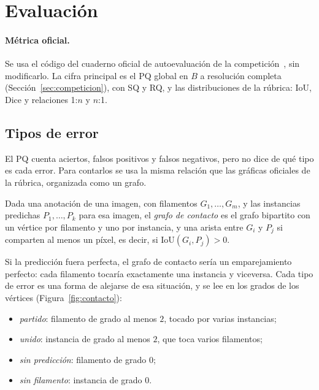 \section{Evaluación}
\label{sec:evaluacion}

\paragraph{Métrica oficial.} Se usa el código del cuaderno oficial de
autoevaluación de la competición~\cite{kaggle2026}, sin modificarlo. La
cifra principal es el PQ global en $B$ a resolución completa
(Sección~\ref{sec:competicion}), con SQ y RQ, y las distribuciones de
la rúbrica: IoU, Dice y relaciones 1:$n$ y $n$:1.

\subsection{Tipos de error}

El PQ cuenta aciertos, falsos positivos y falsos negativos, pero no dice
de qué tipo es cada error. Para contarlos se usa la misma relación que
las gráficas oficiales de la rúbrica, organizada como un grafo.

\begin{definicion}
Dada una anotación de una imagen, con filamentos $G_1,\dots,G_m$, y las
instancias predichas $P_1,\dots,P_k$ para esa imagen, el \emph{grafo de
contacto} es el grafo bipartito con un vértice por filamento y uno por
instancia, y una arista entre $G_i$ y $P_j$ si comparten al menos un
píxel, es decir, si $\mathrm{IoU}(G_i,P_j)>0$.
\end{definicion}

Si la predicción fuera perfecta, el grafo de contacto sería un
emparejamiento perfecto: cada filamento tocaría exactamente una
instancia y viceversa. Cada tipo de error es una forma de alejarse de
esa situación, y se lee en los grados de los vértices
(Figura~\ref{fig:contacto}):
\begin{itemize}
  \item \emph{partido}: filamento de grado al menos $2$, tocado por
  varias instancias;
  \item \emph{unido}: instancia de grado al menos $2$, que toca varios
  filamentos;
  \item \emph{sin predicción}: filamento de grado $0$;
  \item \emph{sin filamento}: instancia de grado $0$.
\end{itemize}

